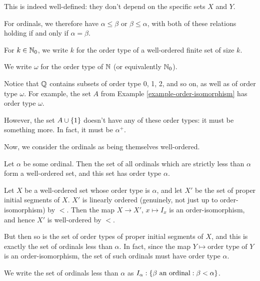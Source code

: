 \documentclass{article}
\begin{document}
\begin{note}
	This is indeed well-defined: they don't depend on the specific sets $X$ and $Y$.
\end{note}

\begin{corollary}
    For ordinals, we therefore have $\alpha \leq \beta$ or $\beta \leq \alpha$, with both of these relations holding if and only if $\alpha = \beta$.
\end{corollary}

\begin{example}
    For $k \in \mathbb{N}_0$, we write $k$ for the order type of a well-ordered finite set of size $k$.
    
    We write $\omega$ for the order type of $\mathbb{N}$ (or equivalently $\mathbb{N}_0$).
    
    Notice that $\mathbb{Q}$ contains subsets of order type 0, 1, 2, and so on, as well as of order type $\omega$. For example, the set $A$ from Example \ref{example-order-isomorphism} has order type $\omega$.
    
    However, the set $A \cup \left\lbrace 1 \right\rbrace$ doesn't have any of these order types: it must be something more. In fact, it must be $\alpha^+$.
\end{example}

Now, we consider the ordinals as being themselves well-ordered.

\begin{proposition}
    Let $\alpha$ be some ordinal. Then the set of all ordinals which are strictly less than $\alpha$ form a well-ordered set, and this set has order type $\alpha$.
\end{proposition}

\begin{prf}
    Let $X$ be a well-ordered set whose order type is $\alpha$, and let $X'$ be the set of proper initial segments of $X$. $X'$ is linearly ordered (genuinely, not just up to order-isomorphism) by $<$. Then the map $X \to X'$, $x \mapsto I_x$ is an order-isomorphism, and hence $X'$ is well-ordered by $<$.
    
    But then so is the set of order types of proper initial segments of $X$, and this is exactly the set of ordinals less than $\alpha$. In fact, since the map $Y \mapsto \text{order type of } Y$ is an order-isomorphism, the set of such ordinals must have order type $\alpha$.
\end{prf}

\begin{note}
	We write the set of ordinals less than $\alpha$ as $I_\alpha: \left\lbrace \beta \text{ an ordinal} : \beta < \alpha \right\rbrace$.
\end{note}
\end{document}
